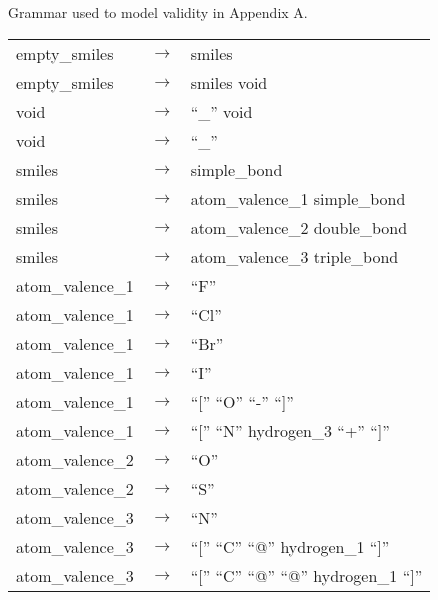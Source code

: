 

\label{annex:grammar-validity}

Grammar used to model \smiles validity in Appendix A\@.

\footnotesize
\begin{longtable}{m{} p{} p{}}
    empty\_smiles & $\rightarrow$ & smiles \\
    empty\_smiles & $\rightarrow$ & smiles void \\
    void & $\rightarrow$ & ``\_'' void \\
    void & $\rightarrow$ & ``\_'' \\
    smiles & $\rightarrow$ & simple\_bond \\
    smiles & $\rightarrow$ & atom\_valence\_1 simple\_bond \\
    smiles & $\rightarrow$ & atom\_valence\_2 double\_bond \\
    smiles & $\rightarrow$ & atom\_valence\_3 triple\_bond \\
    atom\_valence\_1 & $\rightarrow$ & ``F'' \\
    atom\_valence\_1 & $\rightarrow$ & ``Cl'' \\
    atom\_valence\_1 & $\rightarrow$ & ``Br'' \\
    atom\_valence\_1 & $\rightarrow$ & ``I'' \\
    atom\_valence\_1 & $\rightarrow$ & ``['' ``O'' ``-'' ``]'' \\
    atom\_valence\_1 & $\rightarrow$ & ``['' ``N'' hydrogen\_3 ``+'' ``]'' \\
    atom\_valence\_2 & $\rightarrow$ & ``O'' \\
    atom\_valence\_2 & $\rightarrow$ & ``S'' \\
    atom\_valence\_3 & $\rightarrow$ & ``N'' \\
    atom\_valence\_3 & $\rightarrow$ & ``['' ``C'' ``@'' hydrogen\_1 ``]'' \\
    atom\_valence\_3 & $\rightarrow$ & ``['' ``C'' ``@'' ``@'' hydrogen\_1 ``]'' \\

\end{longtable}
